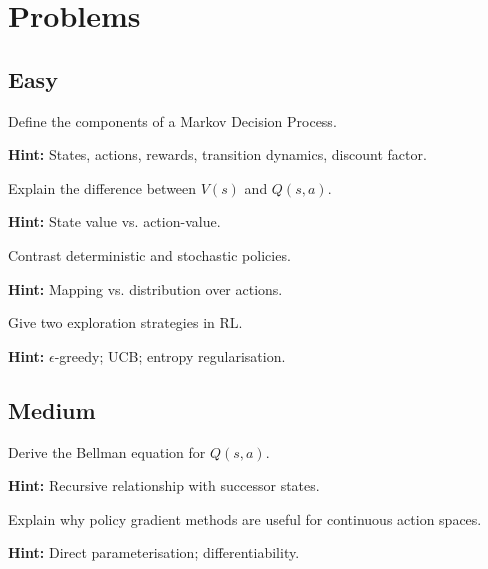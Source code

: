 
\section*{Problems}

\subsection*{Easy}

\begin{problem}
Define the components of a Markov Decision Process.

\textbf{Hint:} States, actions, rewards, transition dynamics, discount factor.
\end{problem}

\begin{problem}
Explain the difference between $V(s)$ and $Q(s,a)$.

\textbf{Hint:} State value vs. action-value.
\end{problem}

\begin{problem}
Contrast deterministic and stochastic policies.

\textbf{Hint:} Mapping vs. distribution over actions.
\end{problem}

\begin{problem}
Give two exploration strategies in RL.

\textbf{Hint:} $\epsilon$-greedy; UCB; entropy regularisation.
\end{problem}

\subsection*{Medium}

\begin{problem}
Derive the Bellman equation for $Q(s,a)$.

\textbf{Hint:} Recursive relationship with successor states.
\end{problem}

\begin{problem}
Explain why policy gradient methods are useful for continuous action spaces.

\textbf{Hint:} Direct parameterisation; differentiability.
\end{problem}

